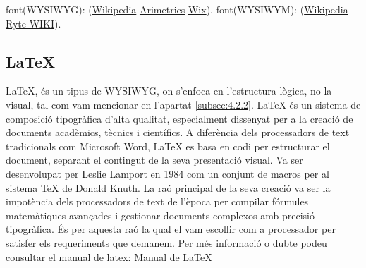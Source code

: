 font(WYSIWYG): (\href{https://es.wikipedia.org/wiki/WYSIWYG}{Wikipedia} \href{https://es.wikipedia.org/wiki/WYSIWYG}{Arimetrics} \href{https://www.wix.com/encyclopedia/definition/wysiwyg}{Wix}).
font(WYSIWYM): (\href{https://en.wikipedia.org/wiki/WYSIWYM}{Wikipedia} \href{https://en.ryte.com/wiki/WYSIWYG/}{Ryte WIKI}).



\subsection{\LaTeX}

\LaTeX, és un tipus de WYSIWYG, on s'enfoca en l'estructura lògica, no la visual, tal com vam mencionar en l'apartat \ref{subsec:4.2.2}. LaTeX és un sistema de composició tipogràfica d'alta qualitat, especialment dissenyat per a la creació de documents acadèmics, tècnics i científics. A diferència dels processadors de text tradicionals com Microsoft Word, LaTeX es basa en codi per estructurar el document, separant el contingut de la seva presentació visual. Va ser desenvolupat per Leslie Lamport en 1984 com un conjunt de macros per al sistema TeX de Donald Knuth. La raó principal de la seva creació va ser la impotència dels processadors de text de l'època per compilar fórmules matemàtiques avançades i gestionar documents complexos amb precisió tipogràfica. És per aquesta raó la qual el vam escollir com a processador per satisfer els requeriments que demanem. Per més informació o dubte podeu consultar el manual de latex:  \href{https://manualdelatex.com/}{Manual de LaTeX}
